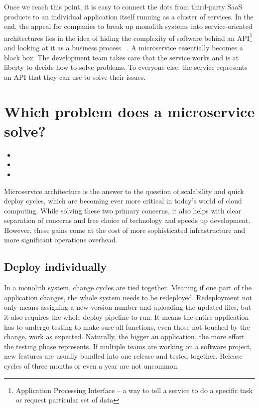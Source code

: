 Once we reach this point, it is easy to connect the dots from third-party SaaS products to an individual application itself running as a cluster of services. In the end, the appeal for companies to break up monolith systems into service-oriented architectures lies in the idea of hiding the complexity of software behind an API\footnote{Application Processing Interface – a way to tell a service to do a specific task or request particular set of data} and looking at it as a business process ~\cite[p.~359]{melzer.2010}. A microservice essentially becomes a black box. The development team takes care that the service works and is at liberty to decide how to solve problems. To everyone else, the service represents an API that they can use to solve their issues.



\section{Which problem does a microservice solve?}
\label{sec:theory:what-problem}

\begin{itemize}
  \item {}
  \item {}
  \item {}
\end{itemize}

Microservice architecture is the answer to the question of scalability and quick deploy cycles, which are becoming ever more critical in today's world of cloud computing. While solving these two primary concerns, it also helps with clear separation of concerns and free choice of technology and speeds up development. However, these gains come at the cost of more sophisticated infrastructure and more significant operations overhead.

\subsection{Deploy individually}

In a monolith system, change cycles are tied together. Meaning if one part of the application changes, the whole system needs to be redeployed. Redeployment not only means assigning a new version number and uploading the updated files, but it also requires the whole deploy pipeline to run. It means the entire application has to undergo testing to make sure all functions, even those not touched by the change, work as expected. Naturally, the bigger an application, the more effort the testing phase represents. If multiple teams are working on a software project, new features are usually bundled into one release and tested together. Release cycles of three months or even a year are not uncommon.

